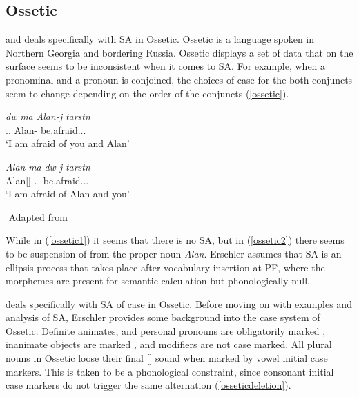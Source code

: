 \subsection{Ossetic}

\cite{erschler2012suspended} and \cite{erschler2018suspended} deals specifically with SA in Ossetic. Ossetic is a language spoken in Northern Georgia and bordering Russia. Ossetic displays a set of data that on the surface seems to be inconsistent when it comes to SA. For example, when a pronominal and a pronoun is conjoined, the choices of case for the both conjuncts seem to change depending on the order of the conjuncts (\ref{ossetic}).

\begin{exe}
    \ex \label{ossetic}
    \begin{xlist}
        \ex \label{ossetic1}
        \gll 
        \textit{d\textturna w} \textit{\textturna ma} \textit{Alan-\textturna j} \textit{tarst\textturna n} \\
        {\Second}.{\Sg}.{\Obl} {\And} Alan-{\Abl} be.afraid.{\Pst}.{\First}.{\Sg} \\
        \glt `I am afraid of you and Alan'
        
        \ex \label{ossetic2}
        \gll 
        \textit{Alan} \textit{\textturna ma} \textit{d\textturna w-\textturna j} \textit{tarst\textturna n} \\
        Alan[{\Nom}] {\And} {\Second}.{\Sg}-{\Abl} be.afraid.{\Pst}.{\First}.{\Sg} \\
        \glt `I am afraid of Alan and you'
    \end{xlist}
    ${}$ \hfill Adapted from \cite{erschler2012suspended}
\end{exe}

While in (\ref{ossetic1}) it seems that there is no SA, but in (\ref{ossetic2}) there seems to be suspension of {\Abl} from the proper noun \textit{Alan}. Erschler assumes that SA is an ellipsis process that takes place after vocabulary insertion at PF, where the morphemes are present for semantic calculation but phonologically null. 

\cite{erschler2012suspended} deals specifically with SA of case in Ossetic. Before moving on with examples and analysis of SA, Erschler provides some background into the case system of Ossetic. Definite animates, and personal pronouns are obligatorily marked {\Obl}, inanimate objects are marked {\Nom}, and modifiers are not case marked. All plural nouns in Ossetic loose their final [\textturna] sound when marked by vowel initial case markers. This is taken to be a phonological constraint, since consonant initial case markers do not trigger the same alternation (\ref{osseticdeletion}).

